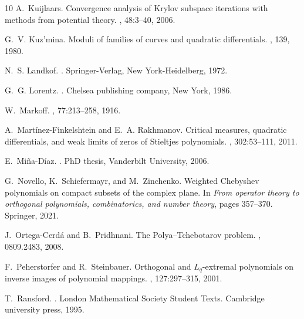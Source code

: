 \documentclass[12pt,oneside,reqno]{amsart}
\theoremstyle{definition}
\numberwithin{equation}{section}
\begin{document}
\begin{thebibliography}{10}
A.~Kuijlaars.
\newblock Convergence analysis of {K}rylov subspace iterations with methods from potential theory.
, 48:3--40, 2006.

G.~V. Kuz'mina.
\newblock Moduli of families of curves and quadratic differentials.
, 139, 1980.

N.~S. Landkof.
.
\newblock Springer-Verlag, New York-Heidelberg, 1972.

G.~G. Lorentz.
.
\newblock Chelsea publishing company, New York, 1986.

W.~Markoff.
, 77:213--258, 1916.

A.~Mart{\'i}nez-Finkelshtein and E.~A. Rakhmanov.
\newblock Critical measures, quadratic differentials, and weak limits of zeros of {S}tieltjes polynomials.
, 302:53--111, 2011.

E.~{Mi{\~{n}}a-D\'{i}az}.
.
\newblock PhD thesis, Vanderbilt University, 2006.

G.~Novello, K.~Schiefermayr, and M.~Zinchenko.
\newblock Weighted {C}hebyshev polynomials on compact subsets of the complex plane.
\newblock In {\em From operator theory to orthogonal polynomials, combinatorics, and number theory}, pages 357--370. Springer, 2021.

J.~Ortega-Cerd\'{a} and B.~Pridhnani.
\newblock The {P}olya--{T}chebotarov problem.
, 0809.2483, 2008.

F.~Peherstorfer and R.~Steinbauer.
\newblock Orthogonal and {$L_q$}-extremal polynomials on inverse images of polynomial mappings.
, 127:297--315, 2001.

T.~Ransford.
.
\newblock London Mathematical Society Student Texts. Cambridge university press, 1995.


\end{thebibliography}
\end{document}
